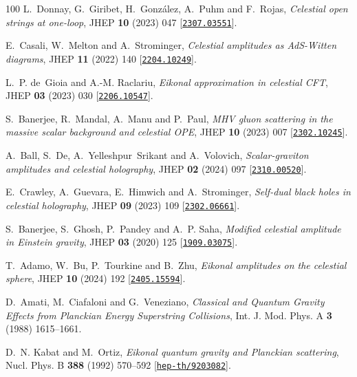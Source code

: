 \begin{thebibliography}{100}
L.~Donnay, G.~Giribet, H.~Gonz\'alez, A.~Puhm and F.~Rojas,  {\em {Celestial
  open strings at one-loop}}, JHEP {\bf 10} (2023) 047
  [\href{http://www.arXiv.org/abs/2307.03551}{{\tt 2307.03551}}].

E.~Casali, W.~Melton and A.~Strominger,  {\em {Celestial amplitudes as
  AdS-Witten diagrams}}, JHEP {\bf 11} (2022) 140
  [\href{http://www.arXiv.org/abs/2204.10249}{{\tt 2204.10249}}].

L.~P. de~Gioia and A.-M. Raclariu,  {\em {Eikonal approximation in celestial
  CFT}}, JHEP {\bf 03} (2023) 030
  [\href{http://www.arXiv.org/abs/2206.10547}{{\tt 2206.10547}}].

S.~Banerjee, R.~Mandal, A.~Manu and P.~Paul,  {\em {MHV gluon scattering in the
  massive scalar background and celestial OPE}}, JHEP {\bf 10} (2023) 007
  [\href{http://www.arXiv.org/abs/2302.10245}{{\tt 2302.10245}}].

A.~Ball, S.~De, A.~Yelleshpur~Srikant and A.~Volovich,  {\em {Scalar-graviton
  amplitudes and celestial holography}}, JHEP {\bf 02} (2024) 097
  [\href{http://www.arXiv.org/abs/2310.00520}{{\tt 2310.00520}}].

E.~Crawley, A.~Guevara, E.~Himwich and A.~Strominger,  {\em {Self-dual black
  holes in celestial holography}}, JHEP {\bf 09} (2023) 109
  [\href{http://www.arXiv.org/abs/2302.06661}{{\tt 2302.06661}}].

S.~Banerjee, S.~Ghosh, P.~Pandey and A.~P. Saha,  {\em {Modified celestial
  amplitude in Einstein gravity}}, JHEP {\bf 03} (2020) 125
  [\href{http://www.arXiv.org/abs/1909.03075}{{\tt 1909.03075}}].

T.~Adamo, W.~Bu, P.~Tourkine and B.~Zhu,  {\em {Eikonal amplitudes on the
  celestial sphere}}, JHEP {\bf 10} (2024) 192
  [\href{http://www.arXiv.org/abs/2405.15594}{{\tt 2405.15594}}].

D.~Amati, M.~Ciafaloni and G.~Veneziano,  {\em {Classical and Quantum Gravity
  Effects from Planckian Energy Superstring Collisions}}, Int. J. Mod. Phys. A
  {\bf 3} (1988) 1615--1661.

D.~N. Kabat and M.~Ortiz,  {\em {Eikonal quantum gravity and Planckian
  scattering}}, Nucl. Phys. B {\bf 388} (1992) 570--592
  [\href{http://www.arXiv.org/abs/hep-th/9203082}{{\tt hep-th/9203082}}].


\end{thebibliography}
